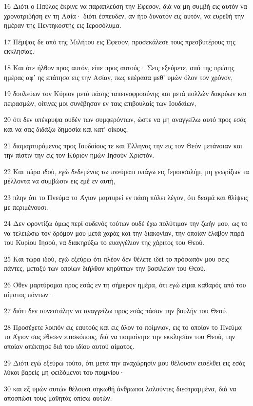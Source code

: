 \par 16 Διότι ο Παύλος έκρινε να παραπλεύση την Έφεσον, διά να μη συμβή εις αυτόν να χρονοτριβήση εν τη Ασία· διότι έσπευδεν, αν ήτο δυνατόν εις αυτόν, να ευρεθή την ημέραν της Πεντηκοστής εις Ιεροσόλυμα.
\par 17 Πέμψας δε από της Μιλήτου εις Έφεσον, προσεκάλεσε τους πρεσβυτέρους της εκκλησίας.
\par 18 Και ότε ήλθον προς αυτόν, είπε προς αυτούς· Σεις εξεύρετε, από της πρώτης ημέρας αφ' ης επάτησα εις την Ασίαν, πως επέρασα μεθ' υμών όλον τον χρόνον,
\par 19 δουλεύων τον Κύριον μετά πάσης ταπεινοφροσύνης και μετά πολλών δακρύων και πειρασμών, οίτινες μοι συνέβησαν εν ταις επιβουλαίς των Ιουδαίων,
\par 20 ότι δεν υπέκρυψα ουδέν των συμφερόντων, ώστε να μη αναγγείλω αυτό προς εσάς και να σας διδάξω δημοσία και κατ' οίκους,
\par 21 διαμαρτυρόμενος προς Ιουδαίους τε και Έλληνας την εις τον Θεόν μετάνοιαν και την πίστιν την εις τον Κύριον ημών Ιησούν Χριστόν.
\par 22 Και τώρα ιδού, εγώ δεδεμένος τω πνεύματι υπάγω εις Ιερουσαλήμ, μη γνωρίζων τα μέλλοντα να συμβώσιν εις εμέ εν αυτή,
\par 23 πλην ότι το Πνεύμα το Άγιον μαρτυρεί εν πάση πόλει λέγον, ότι δεσμά και θλίψεις με περιμένουσι.
\par 24 Δεν φροντίζω όμως περί ουδενός τούτων ουδέ έχω πολύτιμον την ζωήν μου, ως το να τελειώσω τον δρόμον μου μετά χαράς και την διακονίαν, την οποίαν έλαβον παρά του Κυρίου Ιησού, να διακηρύξω το ευαγγέλιον της χάριτος του Θεού.
\par 25 Και τώρα ιδού, εγώ εξεύρω ότι πλέον δεν θέλετε ιδεί το πρόσωπόν μου σεις πάντες, μεταξύ των οποίων διήλθον κηρύττων την βασιλείαν του Θεού.
\par 26 Όθεν μαρτύρομαι προς εσάς εν τη σήμερον ημέρα, ότι εγώ είμαι καθαρός από του αίματος πάντων·
\par 27 διότι δεν συνεστάλην να αναγγείλω προς εσάς πάσαν την βουλήν του Θεού.
\par 28 Προσέχετε λοιπόν εις εαυτούς και εις όλον το ποίμνιον, εις το οποίον το Πνεύμα το Άγιον σας έθεσεν επισκόπους, διά να ποιμαίνητε την εκκλησίαν του Θεού, την οποίαν απέκτησε διά του ιδίου αυτού αίματος.
\par 29 Διότι εγώ εξεύρω τούτο, ότι μετά την αναχώρησίν μου θέλουσιν εισέλθει εις εσάς λύκοι βαρείς μη φειδόμενοι του ποιμνίου·
\par 30 και εξ υμών αυτών θέλουσι σηκωθή άνθρωποι λαλούντες διεστραμμένα, διά να αποσπώσι τους μαθητάς οπίσω αυτών.
